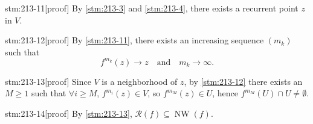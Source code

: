 \begin{stm}{stm:213-11}[proof]
By \ref{stm:213-3} and \ref{stm:213-4}, there exists a recurrent point $z$ in $V$.
\end{stm}

\begin{stm}{stm:213-12}[proof]
By \ref{stm:213-11}, there exists an increasing sequence $(m_k)$ such that 
\[
f^{m_k}(z) \to z \quad \text{and} \quad m_k \to \infty.
\]
\end{stm}

\begin{stm}{stm:213-13}[proof]
Since $V$ is a neighborhood of $z$, by \ref{stm:213-12} there exists an $M \geq 1$ such that $\forall i \geq M$, $f^{m_i}(z) \in V$, so $f^{m_M}(z) \in U$, hence $f^{m_M}(U) \cap U \neq \emptyset$.
\end{stm}

\begin{stm}{stm:213-14}[proof]
By \ref{stm:213-13}, $\mathcal{R}(f) \subseteq \operatorname{NW}(f)$.
\end{stm}
